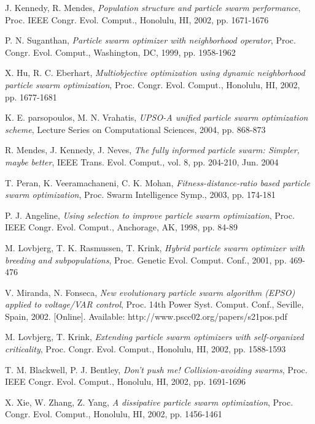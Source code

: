 \documentclass[12pt, twoside, openany, abstract=on]{report}
\theoremstyle{definition}
\begin{document}
\begin{thebibliography}{11}
 J. Kennedy, R. Mendes, \emph{Population structure and particle swarm performance}, Proc. IEEE Congr. Evol. Comput., Honolulu, HI, 2002, pp. 1671-1676

 P. N. Suganthan, \emph{Particle swarm optimizer with neighborhood operator}, Proc. Congr. Evol. Comput., Washington, DC, 1999, pp. 1958-1962

 X. Hu, R. C. Eberhart, \emph{Multiobjective optimization using dynamic neighborhood particle swarm optimization}, Proc. Congr. Evol. Comput., Honolulu, HI, 2002, pp. 1677-1681

 K. E. parsopoulos, M. N. Vrahatis, \emph{UPSO-A unified particle swarm optimization scheme}, Lecture Series on Computational Sciences, 2004, pp. 868-873

 R. Mendes, J. Kennedy, J. Neves, \emph{The fully informed particle swarm: Simpler, maybe better}, IEEE Trans. Evol. Comput., vol. 8, pp. 204-210, Jun. 2004

 T. Peran, K. Veeramachaneni, C. K. Mohan, \emph{Fitness-distance-ratio based particle swarm optimization}, Proc. Swarm Intelligence Symp., 2003, pp. 174-181

 P. J. Angeline, \emph{Using selection to improve particle swarm optimization}, Proc. IEEE Congr. Evol. Comput., Anchorage, AK, 1998, pp. 84-89

 M. Lovbjerg, T. K. Rasmussen, T. Krink, \emph{Hybrid particle swarm optimizer with breeding and subpopulations}, Proc. Genetic Evol. Comput. Conf., 2001, pp. 469-476

 V. Miranda, N. Fonseca, \emph{New evolutionary particle swarm algorithm (EPSO) applied to voltage/VAR control}, Proc. 14th Power Syst. Comput. Conf., Seville, Spain, 2002. [Online]. Available: http://www.pscc02.org/papers/s21pos.pdf

 M. Lovbjerg, T. Krink, \emph{Extending particle swarm optimizers with self-organized criticality}, Proc. Congr. Evol. Comput., Honolulu, HI, 2002, pp. 1588-1593

 T. M. Blackwell, P. J. Bentley, \emph{Don't push me! Collision-avoiding swarms}, Proc. IEEE Congr. Evol. Comput., Honolulu, HI, 2002, pp. 1691-1696

 X. Xie, W. Zhang, Z. Yang, \emph{A dissipative particle swarm optimization}, Proc. Congr. Evol. Comput., Honolulu, HI, 2002, pp. 1456-1461


\end{thebibliography}
\end{document}
